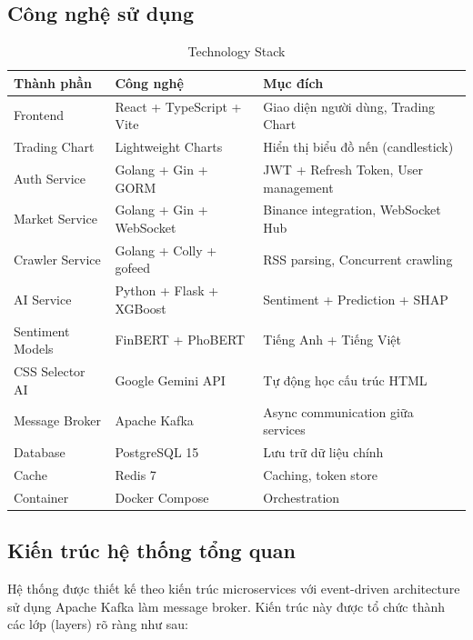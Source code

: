 \subsection*{Công nghệ sử dụng}

\begin{table}[H]
\centering
\caption{Technology Stack}
\begin{tabular}{|l|l|l|}
\hline
\textbf{Thành phần} & \textbf{Công nghệ} & \textbf{Mục đích} \\
\hline
Frontend & React + TypeScript + Vite & Giao diện người dùng, Trading Chart \\
\hline
Trading Chart & Lightweight Charts & Hiển thị biểu đồ nến (candlestick) \\
\hline
Auth Service & Golang + Gin + GORM & JWT + Refresh Token, User management \\
\hline
Market Service & Golang + Gin + WebSocket & Binance integration, WebSocket Hub \\
\hline
Crawler Service & Golang + Colly + gofeed & RSS parsing, Concurrent crawling \\
\hline
AI Service & Python + Flask + XGBoost & Sentiment + Prediction + SHAP \\
\hline
Sentiment Models & FinBERT + PhoBERT & Tiếng Anh + Tiếng Việt \\
\hline
CSS Selector AI & Google Gemini API & Tự động học cấu trúc HTML \\
\hline
Message Broker & Apache Kafka & Async communication giữa services \\
\hline
Database & PostgreSQL 15 & Lưu trữ dữ liệu chính \\
\hline
Cache & Redis 7 & Caching, token store \\
\hline
Container & Docker Compose & Orchestration \\
\hline
\end{tabular}
\end{table}

\subsection*{Kiến trúc hệ thống tổng quan}

Hệ thống được thiết kế theo kiến trúc microservices với event-driven architecture sử dụng Apache Kafka làm message broker. Kiến trúc này được tổ chức thành các lớp (layers) rõ ràng như sau:


